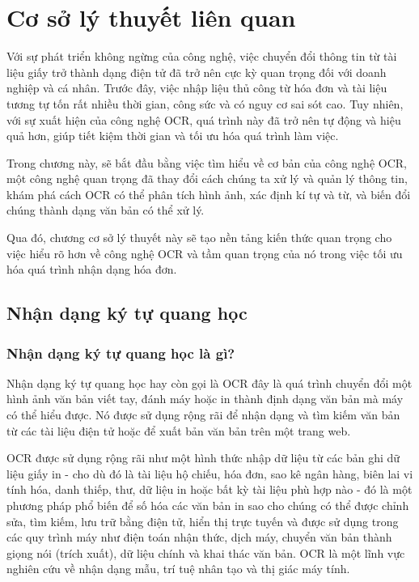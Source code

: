 \chapter{Cơ sở lý thuyết liên quan}
Với sự phát triển không ngừng của công nghệ, việc chuyển đổi thông tin từ tài liệu giấy trở thành dạng điện tử đã trở nên cực kỳ quan trọng đối với doanh nghiệp và cá nhân. Trước đây, việc nhập liệu thủ công từ hóa đơn và tài liệu tương tự tốn rất nhiều thời gian, công sức và có nguy cơ sai sót cao. Tuy nhiên, với sự xuất hiện của công nghệ OCR, quá trình này đã trở nên tự động và hiệu quả hơn, giúp tiết kiệm thời gian và tối ưu hóa quá trình làm việc.

Trong chương này, sẽ bắt đầu bằng việc tìm hiểu về cơ bản của công nghệ OCR, một công nghệ quan trọng đã thay đổi cách chúng ta xử lý và quản lý thông tin, khám phá cách OCR có thể phân tích hình ảnh, xác định kí tự và từ, và biến đổi chúng thành dạng văn bản có thể xử lý.

Qua đó, chương cơ sở lý thuyết này sẽ tạo nền tảng kiến thức quan trọng cho việc hiểu rõ hơn về công nghệ OCR và tầm quan trọng của nó trong việc tối ưu hóa quá trình nhận dạng hóa đơn.

\section{Nhận dạng ký tự quang học}
\subsection{Nhận dạng ký tự quang học là gì?}
Nhận dạng ký tự quang học hay còn gọi là OCR đây là quá trình chuyển đổi một hình ảnh văn bản viết tay, đánh máy hoặc in thành định dạng văn bản mà máy có thể hiểu được. Nó được sử dụng rộng rãi để nhận dạng và tìm kiếm văn bản từ các tài liệu điện tử hoặc để xuất bản văn bản trên một trang web. \cite{aws, survey_ocr_Applications}

OCR được sử dụng rộng rãi như một hình thức nhập dữ liệu từ các bản ghi dữ liệu giấy in - cho dù đó là tài liệu hộ chiếu, hóa đơn, sao kê ngân hàng, biên lai vi tính hóa, danh thiếp, thư, dữ liệu in hoặc bất kỳ tài liệu phù hợp nào - đó là một phương pháp phổ biến để số hóa các văn bản in sao cho chúng có thể được chỉnh sửa, tìm kiếm, lưu trữ bằng điện tử, hiển thị trực tuyến và được sử dụng trong các quy trình máy như điện toán nhận thức, dịch máy, chuyển văn bản thành giọng nói (trích xuất), dữ liệu chính và khai thác văn bản. OCR là một lĩnh vực nghiên cứu về nhận dạng mẫu, trí tuệ nhân tạo và thị giác máy tính.\cite{wiki}

